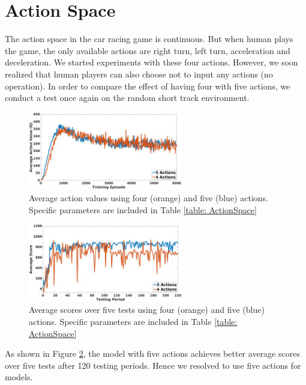 \section{Action Space}
The action space in the car racing game is continuous. But when human
plays the game, the only available actions are right turn, left turn,
acceleration and deceleration. We started experiments with these four
actions. However, we soon realized that human players can also choose
not to input any actions (no operation). In order to compare the
effect of having four with five actions, we conduct a test once again
on the random short track environment. 

\begin{figure}[h]
\centering
\includegraphics[width=0.6\textwidth]{Graphics/AveQ_action.jpg}
\caption[Average Action Values Action Space Comparison]{Average action
  values using four (orange) and five (blue) actions. 
Specific parameters are included in Table \ref{table: ActionSpace}}
\label{fig:action_test}
\end{figure}

\begin{figure}[h]
\centering
\includegraphics[width=0.6\textwidth]{Graphics/TestScore_action.jpg}
\caption[Average Test Score Action Space Comparison]{Average scores
  over five tests using four (orange) and five (blue) actions. 
Specific parameters are included in Table \ref{table: ActionSpace}}
\label{fig:action_aveq}
\end{figure}

As shown in Figure \ref{fig:action_aveq}, the model with five actions
achieves better average scores over five tests after 120 testing
periods. Hence we resolved to use five actions for models. 


